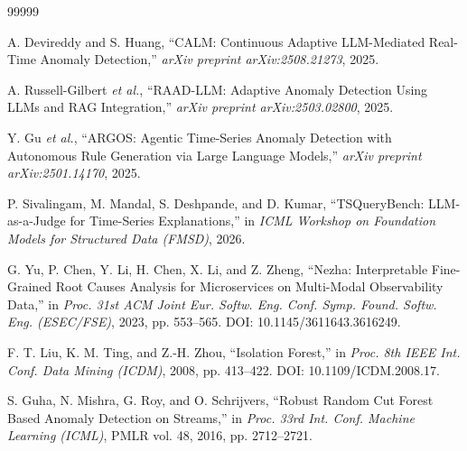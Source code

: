 \documentclass[a4paper,table]{article}
\theoremstyle{definition}
\begin{document}
\begin{thebibliography}{99999}





A. Devireddy and S. Huang, ``CALM: Continuous Adaptive LLM-Mediated Real-Time Anomaly Detection,'' \textit{arXiv preprint arXiv:2508.21273}, 2025.

A. Russell-Gilbert \textit{et al.}, ``RAAD-LLM: Adaptive Anomaly Detection Using LLMs and RAG Integration,'' \textit{arXiv preprint arXiv:2503.02800}, 2025.

Y. Gu \textit{et al.}, ``ARGOS: Agentic Time-Series Anomaly Detection with Autonomous Rule Generation via Large Language Models,'' \textit{arXiv preprint arXiv:2501.14170}, 2025.

P. Sivalingam, M. Mandal, S. Deshpande, and D. Kumar, ``TSQueryBench: LLM-as-a-Judge for Time-Series Explanations,'' in \textit{ICML Workshop on Foundation Models for Structured Data (FMSD)}, 2026.

G. Yu, P. Chen, Y. Li, H. Chen, X. Li, and Z. Zheng, ``Nezha: Interpretable Fine-Grained Root Causes Analysis for Microservices on Multi-Modal Observability Data,'' in \textit{Proc. 31st ACM Joint Eur. Softw. Eng. Conf. Symp. Found. Softw. Eng. (ESEC/FSE)}, 2023, pp. 553--565. DOI: 10.1145/3611643.3616249.

F. T. Liu, K. M. Ting, and Z.-H. Zhou, ``Isolation Forest,'' in \textit{Proc. 8th IEEE Int. Conf. Data Mining (ICDM)}, 2008, pp. 413--422. DOI: 10.1109/ICDM.2008.17.

S. Guha, N. Mishra, G. Roy, and O. Schrijvers, ``Robust Random Cut Forest Based Anomaly Detection on Streams,'' in \textit{Proc. 33rd Int. Conf. Machine Learning (ICML)}, PMLR vol. 48, 2016, pp. 2712--2721.


\end{thebibliography}
\end{document}
